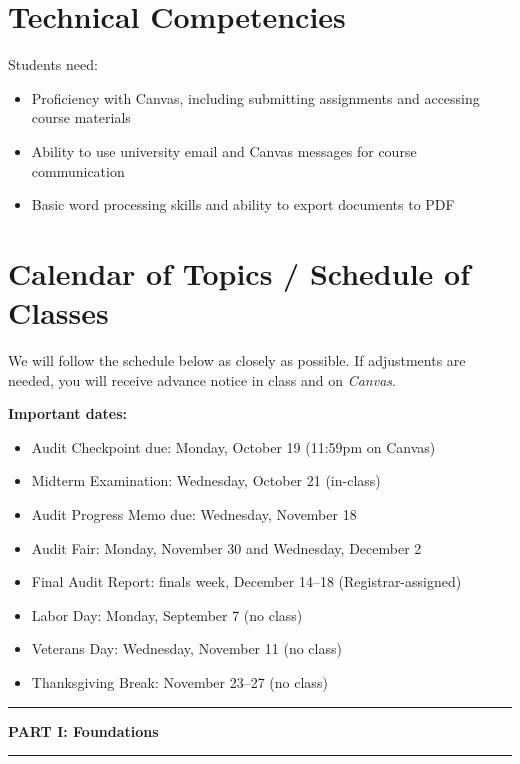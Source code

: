 \documentclass[12pt]{article}
\begin{document}
\section*{Technical Competencies}
Students need:
\begin{itemize}
\item Proficiency with Canvas, including submitting assignments and accessing course materials
\item Ability to use university email and Canvas messages for course communication
\item Basic word processing skills and ability to export documents to PDF
\end{itemize}

\section*{Calendar of Topics / Schedule of Classes}

We will follow the schedule below as closely as possible. If adjustments are needed, you will receive advance notice in class and on \emph{Canvas}.

\vspace{0.5em}
\noindent \textbf{Important dates:}
\begin{itemize}
    \item Audit Checkpoint due: Monday, October 19 (11:59pm on Canvas)
    \item Midterm Examination: Wednesday, October 21 (in-class)
    \item Audit Progress Memo due: Wednesday, November 18
    \item Audit Fair: Monday, November 30 and Wednesday, December 2
    \item Final Audit Report: finals week, December 14--18 (Registrar-assigned)
    \item Labor Day: Monday, September 7 (no class)
    \item Veterans Day: Wednesday, November 11 (no class)
    \item Thanksgiving Break: November 23--27 (no class)
\end{itemize}

\bigskip

\noindent\rule{\textwidth}{0.6pt}
\begin{center}\textbf{PART I: Foundations}\end{center}
\noindent\rule{\textwidth}{0.6pt}
\end{document}
